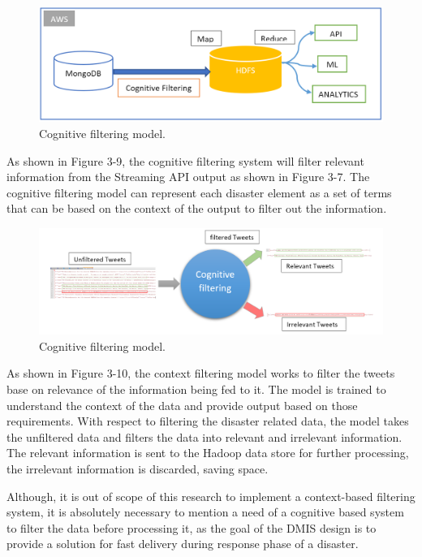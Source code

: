 \begin{figure}[ht!]
	\centering
	\includegraphics[width=150mm]{ContextFiltering.png}
	\caption{Cognitive filtering model. \label{overflow}}
\end{figure}

As shown in Figure 3-9, the cognitive filtering system will filter relevant information from the Streaming API output as shown in Figure 3-7. The cognitive filtering model can represent each disaster element as a set of terms that can be based on the context of the output to filter out the information.

\begin{figure}[ht!]
	\centering
	\includegraphics[width=150mm]{ContextFilteringWorking.png}
	\caption{Cognitive filtering model. \label{overflow}}
\end{figure}

As shown in Figure 3-10, the context filtering model works to filter the tweets base on relevance of the information being fed to it. The model is trained to understand the context of the data and provide output based on those requirements. With respect to filtering the disaster related data, the model takes the unfiltered data and filters the data into relevant and irrelevant information. The relevant information is sent to the Hadoop data store for further processing, the irrelevant information is discarded, saving space.

Although, it is out of scope of this research to implement a context-based filtering system, it is absolutely necessary to mention a need of a cognitive based system to filter the data before processing it, as the goal of the DMIS design is to provide a solution for fast delivery during response phase of a disaster.

